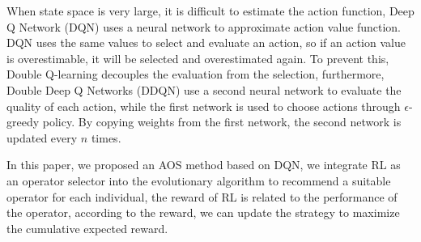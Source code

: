 \documentclass[journal]{IEEEtran}
\begin{document}
When state space is very large, it is difficult to estimate the action function, Deep Q Network (DQN) \cite{mnih2015human} uses a neural network to approximate action value function.
DQN uses the same values to select and evaluate an action, so if an action value is overestimable, it will be selected and overestimated again. To prevent this, Double Q-learning \cite{hasselt2010double} decouples the evaluation from the selection,
furthermore, Double Deep Q Networks (DDQN) \cite{ddqn} use a second neural network to evaluate the quality of each action, while the first network is used to choose actions through $\epsilon$-greedy policy.
By copying weights from the first network, the second network is updated every $n$ times.

In this paper, we proposed an AOS method based on DQN,
we integrate RL as an operator selector into the evolutionary algorithm to recommend a suitable operator for each individual, the reward of RL is related to the performance of the operator, according to the reward, we can update the strategy to maximize the cumulative expected reward.

\end{document}
